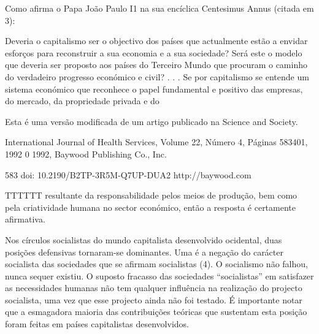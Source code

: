  \par 
Como afirma o Papa João Paulo I1 na sua encíclica Centesimus Annus (citada em {\color{blue}3}):
 \par 
Deveria o capitalismo ser o objectivo dos países que actualmente estão a envidar esforços para reconstruir a sua economia e a sua sociedade? Será este o modelo que deveria ser proposto aos países do Terceiro Mundo que procuram o caminho do verdadeiro progresso económico e civil? . . . Se por capitalismo se entende um sistema económico que reconhece o papel fundamental e positivo das empresas, do mercado, da propriedade privada e do
 \par 
Esta é uma versão modificada de um artigo publicado na Science and Society.
 \par 
International Journal of Health Services, Volume 22, Número 4, Páginas 583401, 1992 {\color{blue}0} 1992, Baywood Publishing Co., Inc.
 \par 
583 doi: {\color{blue}10}.2190/B2TP-3R5M-Q7UP-DUA2 http://baywood.com
 \par 
TTTTTT resultante da responsabilidade pelos meios de produção, bem como pela criatividade humana no sector económico, então a resposta é certamente afirmativa.
 \par 
Nos círculos socialistas do mundo capitalista desenvolvido ocidental, duas posições defensivas tornaram-se dominantes. Uma é a negação do carácter socialista das sociedades que se afirmam socialistas (4). O socialismo não falhou, nunca sequer existiu. O suposto fracasso das sociedades “socialistas” em satisfazer as necessidades humanas não tem qualquer influência na realização do projecto socialista, uma vez que esse projecto ainda não foi testado. É importante notar que a esmagadora maioria das contribuições teóricas que sustentam esta posição foram feitas em países capitalistas desenvolvidos.
 \par 
